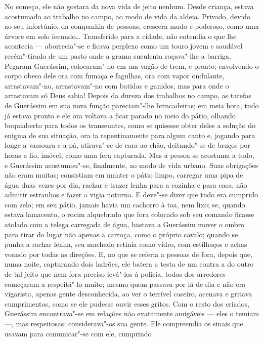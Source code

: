 No começo, ele não gostara da nova vida de jeito nenhum. Desde criança,
estava acostumado ao trabalho no campo, ao modo de vida da aldeia.
Privado, devido ao seu infortúnio, da companhia de pessoas, crescera
mudo e poderoso, como uma árvore em solo fecundo\ldots{} Transferido para a
cidade, não entendia o que lhe acontecia --- aborrecia"-se e ficava
perplexo como um touro jovem e saudável recém"-tirado de um pasto onde a
grama suculenta roçava"-lhe a barriga. Pegaram Guerássim, colocaram"-no em
um vagão de trem, e pronto; envolvendo o corpo obeso dele ora com fumaça
e fagulhas, ora com vapor ondulante, arrastavam"-no, arrastavam"-no com
batidas e ganidos, mas para onde o arrastavam só Deus sabia! Depois da
dureza dos trabalhos no campo, as tarefas de Guerássim em sua nova
função pareciam"-lhe brincadeiras; em meia hora, tudo já estava pronto e
ele ora voltava a ficar parado no meio do pátio, olhando boquiaberto
para todos os transeuntes, como se quisesse obter deles a solução do
enigma de sua situação, ora ia repentinamente para algum canto e,
jogando para longe a vassoura e a pá, atirava"-se de cara ao chão,
deitando"-se de bruços por horas a fio, imóvel, como uma fera capturada.
Mas a pessoa se acostuma a tudo, e Guerássim acostumou"-se, finalmente,
ao modo de vida urbano. Suas obrigações não eram muitas; consistiam em
manter o pátio limpo, carregar uma pipa de água duas vezes por dia,
rachar e trazer lenha para a cozinha e para casa, não admitir estranhos
e fazer a vigia noturna. E deve"-se dizer que tudo era cumprido com zelo;
em seu pátio, jamais havia um cachorro à toa, nem lixo; se, quando
estava lamacento, o rocim alquebrado que fora colocado sob seu comando
ficasse atolado com a telega carregada de água, bastava a Guerássim
mover o ombro para tirar do lugar não apenas a carroça, como o próprio
cavalo; quando se punha a rachar lenha, seu machado retinia como vidro,
com estilhaços e achas voando por todas as direções. E, no que se
referia a pessoas de fora, depois que, numa noite, capturando dois
ladrões, ele batera a testa de um contra a do outro de tal jeito que nem
fora preciso levá"-los à polícia, todos dos arredores começaram a
respeitá"-lo muito; mesmo quem passava por lá de dia e não era vigarista,
apenas gente desconhecida, ao ver o terrível caseiro, acenava e gritava
cumprimentos, como se ele pudesse ouvir esses gritos. Com o resto dos
criados, Guerássim encontrava"-se em relações não exatamente amigáveis
--- eles o temiam ---, mas respeitosas; considerava"-os sua gente. Ele
compreendia os sinais que usavam para comunicar"-se com ele, cumprindo
